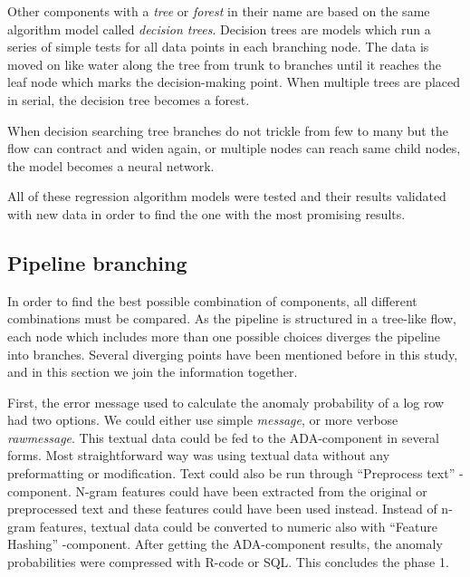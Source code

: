 Other components with a \textit{tree} or \textit{forest} in their name
are based on the same algorithm model called \textit{decision trees}.
Decision trees are models
which run a series of simple tests
for all data points in each branching node.
The data is moved on like water along the tree from trunk to branches
until it reaches the leaf node which marks the decision-making point.
When multiple trees are placed in serial,
the decision tree becomes a forest.~\cite{azure2021decisionforest}

When decision searching tree branches do not trickle from few to many
but the flow can contract and widen again,
or multiple nodes can reach same child nodes,
the model becomes a neural network.

All of these regression algorithm models
were tested and their results validated with new data
in order to find the one with the most promising results.




\subsection{Pipeline branching}\label{subsec:pipe-branching}

In order to find the best possible combination of components,
all different combinations must be compared.
As the pipeline is structured in a tree-like flow,
each node which includes more than one possible choices
diverges the pipeline into branches.
Several diverging points have been mentioned before in this study,
and in this section we join the information together.

First,
the error message used to calculate the anomaly probability of a log row
had two options.
We could either use simple \textit{message},
or more verbose \textit{rawmessage}.
This textual data could be fed to the ADA-component in several forms.
Most straightforward way was using textual data without any preformatting or modification.
Text could also be run through \enquote{Preprocess text} -component.
N-gram features could have been extracted from the original or preprocessed text
and these features could have been used instead.
Instead of n-gram features,
textual data could be converted to numeric
also with \enquote{Feature Hashing} -component.
After getting the ADA-component results,
the anomaly probabilities were compressed with R-code or SQL.\@
This concludes the phase 1.


